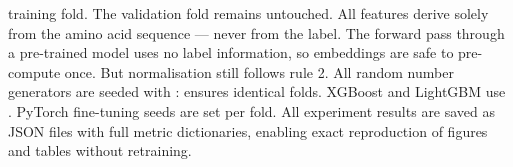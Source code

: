 {}training fold. The validation fold remains untouched.\markdownRendererOlItemEnd 
{} All features derive solely from the amino acid sequence — never from\markdownRendererSoftLineBreak
{}the label.\markdownRendererOlItemEnd 
{} The forward pass through a pre-trained model uses no\markdownRendererSoftLineBreak
{}label information, so embeddings are safe to pre-compute once. But normalisation still\markdownRendererSoftLineBreak
{}follows rule 2.\markdownRendererOlItemEnd 
\markdownRendererOlEnd \markdownRendererInterblockSeparator
{}\markdownRendererThematicBreak{}\markdownRendererInterblockSeparator
{}
\markdownRendererSectionEnd \markdownRendererSectionBegin
{}\markdownRendererInterblockSeparator
{}\markdownRendererSectionBegin
{}\markdownRendererInterblockSeparator
{}All random number generators are seeded with :\markdownRendererInterblockSeparator
{}\markdownRendererInterblockSeparator
{}
\markdownRendererSectionEnd \markdownRendererSectionBegin
{}\markdownRendererInterblockSeparator
{}\markdownRendererUlBeginTight
\markdownRendererUlItem {} ensures identical folds.\markdownRendererUlItemEnd 
\markdownRendererUlItem XGBoost and LightGBM use .\markdownRendererUlItemEnd 
\markdownRendererUlItem PyTorch fine-tuning seeds are set per fold.\markdownRendererUlItemEnd 
\markdownRendererUlEndTight \markdownRendererInterblockSeparator
{}
\markdownRendererSectionEnd \markdownRendererSectionBegin
{}\markdownRendererInterblockSeparator
{}All experiment results are saved as JSON files with full metric dictionaries,\markdownRendererSoftLineBreak
{}enabling exact reproduction of figures and tables without retraining.\markdownRendererInterblockSeparator
{}\markdownRendererThematicBreak{}\markdownRendererInterblockSeparator
{}
\markdownRendererSectionEnd 
\markdownRendererSectionEnd \markdownRendererSectionBegin
{}\markdownRendererInterblockSeparator
